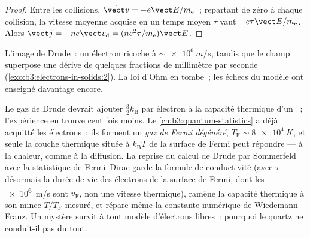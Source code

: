 \begin{proof}
Entre les collisions, $\dot{\vect v} = -e\vect E/m_{\text{e}}$~;
repartant de zéro à chaque collision, la vitesse moyenne acquise en un
temps moyen $\tau$ vaut $-e\tau\vect E/m_{\text{e}}$. Alors $\vect j =
-ne\vect v_{\text{d}} = (ne^2\tau/m_{\text{e}})\vect E$.
\end{proof}

\begin{omfigure}

{\small L'image de Drude~: un électron ricoche à
$\sim\qty{e6}{m/s}$, tandis que le champ superpose une dérive de
quelques fractions de millimètre par seconde
(\cref{exo:b3:electrons-in-solids:2}). La loi d'Ohm en tombe~; les
échecs du modèle ont enseigné davantage encore.}
\end{omfigure}

\begin{remark}\label{rem:b3:electrons-in-solids:sommerfeld}
Le gaz de Drude devrait ajouter $\tfrac32k_{\text{B}}$ par électron à
la capacité thermique d'un ~; l'expérience en trouve cent fois
moins. Le \cref{ch:b3:quantum-statistics} a déjà acquitté les
électrons~: ils forment un \emph{gaz de Fermi dégénéré}, $T_{\text{F}} \sim
\qty{8e4}{K}$, et seule la couche thermique située à
$k_{\text{B}}T$ de la surface de Fermi peut répondre --- à la
chaleur, comme à la diffusion. La reprise du calcul de Drude par
Sommerfeld avec la statistique de Fermi--Dirac garde la formule de
conductivité (avec $\tau$ désormais la durée de vie des électrons de
la surface de Fermi, dont les \qty{e6}{m/s} sont $v_{\text{F}}$, non
une vitesse thermique), ramène la capacité thermique à son mince
$T/T_{\text{F}}$ mesuré, et répare même la constante numérique de
Wiedemann--Franz. Un mystère survit à tout modèle d'électrons
libres~: pourquoi le quartz ne conduit-il pas du tout.
\end{remark}

